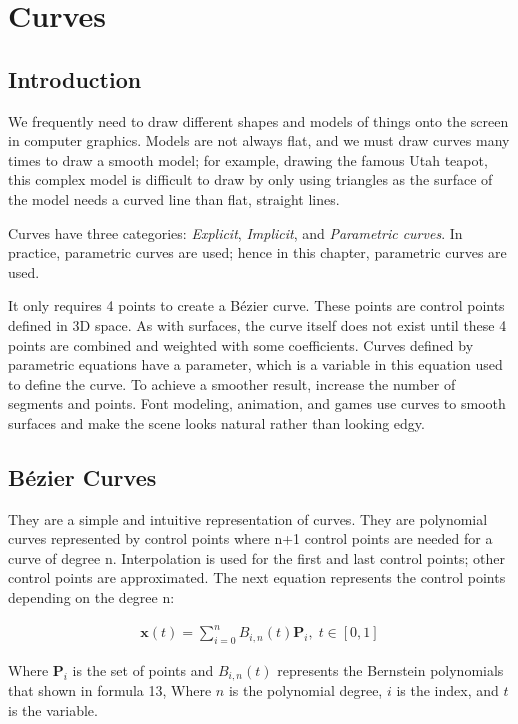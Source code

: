 \documentclass{article}
\begin{document}
	\section{Curves}
	\subsection{Introduction}
	We frequently need to draw different shapes and models of things onto the screen in computer graphics. Models are not always flat, and we must draw curves many times to draw a smooth model; for example, drawing the famous Utah teapot, this complex model is difficult to draw by only using triangles as the surface of the model needs a curved line than flat, straight lines. 
	
	\vspace*{5px}
	Curves have three categories: \textit{Explicit}, \textit{Implicit}, and \textit{Parametric curves}. In practice, parametric curves are used; hence in this chapter, parametric curves are used.
	
	It only requires 4 points to create a Bézier curve. These points are control points defined in 3D space. As with surfaces, the curve itself does not exist until these 4 points are combined and weighted with some coefficients. Curves defined by parametric equations have a parameter, which is a variable in this equation used to define the curve. To achieve a smoother result, increase the number of segments and points.
	Font modeling, animation, and games use curves to smooth surfaces and make the scene looks natural rather than looking edgy. 
	
	\subsection{Bézier Curves}
	They are a simple and intuitive representation of curves. They are polynomial curves represented by control points where n+1 control points are needed for a curve of degree n.
	Interpolation is used for the first and last control points; other control points are approximated. The next equation represents the control points depending on the degree n: 
	
	\begin{equation}
		\begin{split}
			\pmb{x}(t)=\sum_{i = 0}^{n} B_{i,n}(t) \pmb{P}_i, \; t \in [0,1]
		\end{split}		
	\end{equation}
	
	Where $  \pmb{P}_i $ is the set of points and $ B_{i,n}(t) $ represents the Bernstein polynomials that shown in formula 13, Where $ n $ is the polynomial degree, $ i $ is the index, and $ t  $ is the variable.
	
\end{document}
